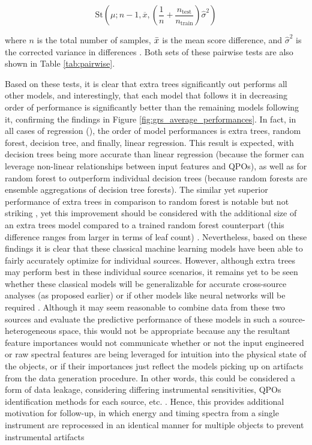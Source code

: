 \documentclass[fleqn,usenatbib,twocolumn]{mnras}%
\begin{document}

\begin{equation}\label{eq:bay}
    \mathrm{St}(\mu;n-1,\overline{x},(\frac{1}{n}+\frac{n_{\mathrm{test}}}{n_{\mathrm{train}}}) %
\hat{\sigma}^2)
\end{equation}

\noindent where $n$ is the total number of samples, $\Bar{x}$ is the mean score difference, and $\hat{\sigma}^2$ is the \cite{nadeauandbengio} corrected variance in differences \citep{scikit-learn}. Both sets of these pairwise tests are also shown in Table \ref{tab:pairwise}. 

Based on these tests, it is clear that extra trees significantly out performs all other models, and interestingly, that each model that follows it in decreasing order of performance is significantly better than the remaining models following it, confirming the findings in Figure \ref{fig:grs_average_performances}. In fact, in all cases of regression (), the order of model performances is extra trees, random forest, decision tree, and finally, linear regression. This result is expected, with decision trees being more accurate than linear regression (because the former can leverage non-linear relationships between input features and QPOs), as well as for random forest to outperform individual decision trees (because random forests are ensemble aggregations of decision tree forests). The similar yet superior performance of extra trees in comparison to random forest is notable but not striking \citep{mathew2022optimized}, yet this improvement should be considered with the additional size of an extra trees model compared to a trained random forest counterpart (this difference ranges from larger in terms of leaf count) \citep{extratrees}. Nevertheless, based on these findings it is clear that these classical machine learning models have been able to fairly accurately optimize for individual sources. However, although extra trees may perform best in these individual source scenarios, it remains yet to be seen whether these classical models will be generalizable for accurate cross-source analyses (as proposed earlier) or if other models like neural networks will be required \citep{NIPS2017_10ce03a1}. Although it may seem reasonable to combine data from these two sources and evaluate the predictive performance of these models in such a source-heterogeneous space, this would not be appropriate because any the resultant feature importances would not communicate whether or not the input engineered or raw spectral features are being leveraged for intuition into the physical state of the objects, or if their importances just reflect the models picking up on artifacts from the data generation procedure. In other words, this could be considered a form of data leakage, considering differing instrumental sensitivities, QPOs identification methods for each source, etc. \citep{Hannun2021MeasuringDL,2022arXiv220903345Y}. Hence, this provides additional motivation for follow-up, in which energy and timing spectra from a single instrument are reprocessed in an identical manner for multiple objects to prevent instrumental artifacts 
\end{document}
